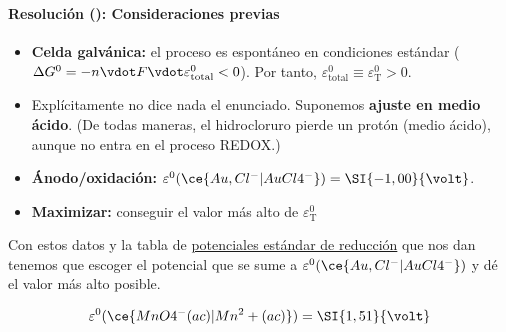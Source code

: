\begin{frame}
	\frametitle{\ejerciciocmd}
	\framesubtitle{Resolución (): Consideraciones previas}
	\begin{itemize}
		\item\textbf{Celda galvánica:} el proceso es espontáneo en condiciones estándar ($\Delta G^0 = - n\vdot F\vdot\varepsilon^0_{\text{total}} < 0$). Por tanto, $\varepsilon^0_{\text{total}}\equiv\varepsilon^0_{\text{T}} > 0$.
		\item Explícitamente no dice nada el enunciado. Suponemos \textbf{ajuste en medio ácido}. {\small (De todas maneras, el hidrocloruro pierde un protón (medio ácido), aunque no entra en el proceso REDOX.)}
		\item\textbf{Ánodo/oxidación:} $\varepsilon^0(\ce{Au,Cl^-|AuCl4^-}) = \SI{-1,00}{\volt}$.
		\item\textbf{Maximizar:} conseguir el valor más alto de $\varepsilon^0_\text{T}$
	\end{itemize}
	Con estos datos y la tabla de \underline{potenciales estándar de reducción} que nos dan tenemos que escoger el potencial que se sume a $\varepsilon^0(\ce{Au,Cl^-|AuCl4^-})$ y dé el valor más alto posible.

	$$
		\varepsilon^0(\ce{MnO4^-(ac)|Mn^2+(ac)}) = \SI{1,51}{\volt}
	$$
\end{frame}

